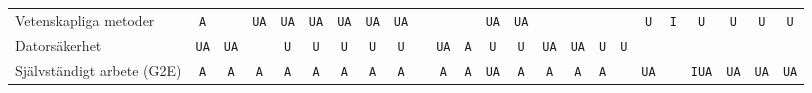 \begin{sidewaystable}[H]
{\begin{tabular}{lccccccccccccccccccccccc}
Vetenskapliga metoder                    & \texttt{A}   &     & \texttt{UA}  & \texttt{UA}  & \texttt{UA}  & \texttt{UA}  & \texttt{UA}  & \texttt{UA}  &     &     &     & \texttt{UA}  & \texttt{UA}  &     &     &     &     & \texttt{U}   & \texttt{I}   & \texttt{U}   & \texttt{U}   & \texttt{U}   & \texttt{U}   \tabularnewline
Datorsäkerhet                            & \texttt{UA}  & \texttt{UA}  &     & \texttt{U}   & \texttt{U}   & \texttt{U}   & \texttt{U}   & \texttt{U}   &     & \texttt{UA}  & \texttt{A}   & \texttt{U}   & \texttt{U}   & \texttt{UA}  & \texttt{UA}  & \texttt{U}   & \texttt{U}   &     &     &     &     &     &     \tabularnewline
Självständigt arbete (G2E)               & \texttt{A}   & \texttt{A}   & \texttt{A}   & \texttt{A}   & \texttt{A}   & \texttt{A}   & \texttt{A}   & \texttt{A}   &     & \texttt{A}   & \texttt{A}   & \texttt{UA}  & \texttt{A}   & \texttt{A}   & \texttt{A}   & \texttt{A}   &     & \texttt{UA}  &     & \texttt{IUA} & \texttt{UA}  & \texttt{UA}  & \texttt{UA}  \tabularnewline
\bottomrule
\end{tabular}
}
\end{sidewaystable}

